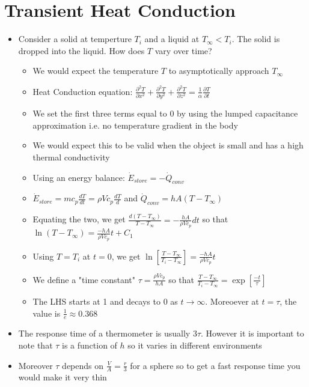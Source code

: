 \documentclass[12pt]{article}
\begin{document}
\section{Transient Heat Conduction} 
\begin{itemize}
    \item Consider a solid at temperture $T_i$ and a liquid at $T_{\infty} < T_i$. The solid is dropped into the liquid. How does $T$ vary over time? \begin{itemize}
        \item We would expect the temperature $T$ to asymptotically approach $T_{\infty}$
        \item Heat Conduction equation: $\frac{\partial^2 T}{\partial x^2} + \frac{\partial^2 T}{\partial y^2} + \frac{\partial^2 T}{\partial z^2} = \frac{1}{\alpha} \frac{\partial T}{\partial t}$
        \item We set the first three terms equal to 0 by using the lumped capacitance approximation i.e. no temperature gradient in the body
        \item We would expect this to be valid when the object is small and has a high thermal conductivity
        \item Using an energy balance: $\dot{E}_{store} = - \dot{Q}_{conv}$
        \item $\dot{E}_{store} = mc_p \frac{dT}{dt} = \rho V c_p \frac{dT}{d}$ and $\dot{Q}_{conv} = hA(T - T_{\infty})$
        \item Equating the two, we get $\frac{d(T - T_{\infty})}{T-T_{\infty}} = - \frac{hA}{\rho V c_p} dt$ so that $\ln (T - T_{\infty}) = \frac{-hA}{\rho V c_p} t + C_1$
        \item Using $T = T_i$ at $t = 0$, we get $\ln \left[ \frac{T-T_{\infty}}{T_i - T_{\infty}} \right] = \frac{-hA}{\rho V c_p} t$
        \item We define a "time constant" $\tau = \frac{\rho V c_p}{hA}$ so that $\frac{T-T_{\infty}}{T_i - T_{\infty}} = \exp \left[\frac{-t}{\tau}\right]$
        \item The LHS starts at 1 and decays to 0 as $t \rightarrow \infty$. Moreoever at $t  =\tau$, the value is $\frac{1}{e} \approx 0.368$ 
    \end{itemize}
    \item The response time of a thermometer is usually $3 \tau$. However it is important to note that $\tau$ is a function of $h$ so it varies in different environments
    \item Moreover $\tau$ depends on $\frac{V}{A} = \frac{r}{3}$ for a sphere so to get a fast response time you would make it very thin

\end{itemize}
\end{document}
